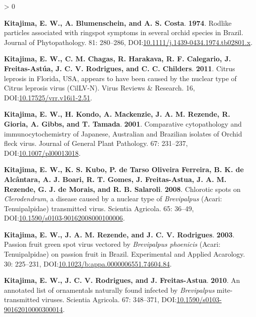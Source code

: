 \documentclass{ufdissertation}[overrideChapters] %
\newlength{\cslhangindent}
\newenvironment{CSLReferences}[2] %
 {%
  \setlength{\parindent}{0pt}
  \ifodd #1 \everypar{\setlength{\hangindent}{\cslhangindent}}\ignorespaces\fi
  \ifnum #2 > 0
  \setlength{\parskip}{#2\baselineskip}
  \fi
 }%
 {}
\begin{document}
{\begin{CSLReferences}{1}{1}
\leavevmode{}%
\textbf{Kitajima, E. W., A. Blumenschein, and A. S. Costa}. \textbf{1974}. Rodlike particles associated with ringspot symptoms in several orchid species in {Brazil}. Journal of Phytopathology. 81: 280--286, DOI:\href{https://doi.org/10.1111/j.1439-0434.1974.tb02801.x}{10.1111/j.1439-0434.1974.tb02801.x}.

\leavevmode{}%
\textbf{Kitajima, E. W., C. M. Chagas, R. Harakava, R. F. Calegario, J. Freitas-Astúa, J. C. V. Rodrigues, and C. C. Childers}. \textbf{2011}. {Citrus leprosis} in {Florida}, {USA}, appears to have been caused by the nuclear type of {Citrus leprosis virus} ({CilLV-N}). Virus Reviews {\&} Research. 16, DOI:\href{https://doi.org/10.17525/vrr.v16i1-2.51}{10.17525/vrr.v16i1-2.51}.

\leavevmode{}%
\textbf{Kitajima, E. W., H. Kondo, A. Mackenzie, J. A. M. Rezende, R. Gioria, A. Gibbs, and T. Tamada}. \textbf{2001}. Comparative cytopathology and immunocytochemistry of {Japanese}, {Australian} and {Brazilian} isolates of {Orchid fleck virus}. Journal of General Plant Pathology. 67: 231--237, DOI:\href{https://doi.org/10.1007/pl00013018}{10.1007/pl00013018}.

\leavevmode{}%
\textbf{Kitajima, E. W., K. S. Kubo, P. de Tarso Oliveira Ferreira, B. K. de Alcântara, A. J. Boari, R. T. Gomes, J. Freitas-Astua, J. A. M. Rezende, G. J. de Morais, and R. B. Salaroli}. \textbf{2008}. Chlorotic spots on {\emph{Clerodendrum}}, a disease caused by a nuclear type of {\emph{Brevipalpus}} ({Acari}: {Tenuipalpidae}) transmitted virus. Scientia Agricola. 65: 36--49, DOI:\href{https://doi.org/10.1590/s0103-90162008000100006}{10.1590/s0103-90162008000100006}.

\leavevmode{}%
\textbf{Kitajima, E. W., J. A. M. Rezende, and J. C. V. Rodrigues}. \textbf{2003}. {Passion fruit green spot virus} vectored by {\emph{Brevipalpus phoenicis}} ({Acari}: {Tenuipalpidae}) on passion fruit in {Brazil}. Experimental and Applied Acarology. 30: 225--231, DOI:\href{https://doi.org/10.1023/b:appa.0000006551.74604.84}{10.1023/b:appa.0000006551.74604.84}.

\leavevmode{}%
\textbf{Kitajima, E. W., J. C. V. Rodrigues, and J. Freitas-Astua}. \textbf{2010}. An annotated list of ornamentals naturally found infected by {\emph{Brevipalpus}} mite-transmitted viruses. Scientia Agricola. 67: 348--371, DOI:\href{https://doi.org/10.1590/s0103-90162010000300014}{10.1590/s0103-90162010000300014}.


\end{CSLReferences}}
\end{document}
